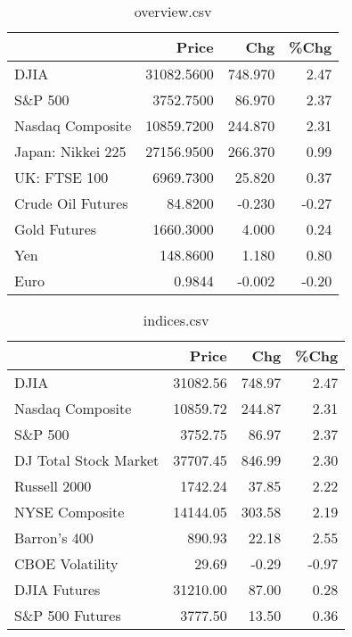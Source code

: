 \documentclass{article}%
\begin{document}
\begin{table}[htbp]%
\caption{overview.csv}%
\centering%
\begin{adjustbox}{width=1\textwidth}%
\begin{tabular}{lrrr}
\toprule
                  &      Price &     Chg &  \%Chg \\
\midrule
             DJIA & 31082.5600 & 748.970 &  2.47 \\
          S\&P 500 &  3752.7500 &  86.970 &  2.37 \\
 Nasdaq Composite & 10859.7200 & 244.870 &  2.31 \\
Japan: Nikkei 225 & 27156.9500 & 266.370 &  0.99 \\
     UK: FTSE 100 &  6969.7300 &  25.820 &  0.37 \\
Crude Oil Futures &    84.8200 &  -0.230 & -0.27 \\
     Gold Futures &  1660.3000 &   4.000 &  0.24 \\
              Yen &   148.8600 &   1.180 &  0.80 \\
             Euro &     0.9844 &  -0.002 & -0.20 \\
\bottomrule
\end{tabular}
%
\end{adjustbox}%
\end{table}

%


\begin{table}[htbp]%
\caption{indices.csv}%
\centering%
\begin{adjustbox}{width=1\textwidth}%
\begin{tabular}{lrrr}
\toprule
                      &    Price &    Chg &  \%Chg \\
\midrule
                 DJIA & 31082.56 & 748.97 &  2.47 \\
     Nasdaq Composite & 10859.72 & 244.87 &  2.31 \\
              S\&P 500 &  3752.75 &  86.97 &  2.37 \\
DJ Total Stock Market & 37707.45 & 846.99 &  2.30 \\
         Russell 2000 &  1742.24 &  37.85 &  2.22 \\
       NYSE Composite & 14144.05 & 303.58 &  2.19 \\
         Barron's 400 &   890.93 &  22.18 &  2.55 \\
      CBOE Volatility &    29.69 &  -0.29 & -0.97 \\
         DJIA Futures & 31210.00 &  87.00 &  0.28 \\
      S\&P 500 Futures &  3777.50 &  13.50 &  0.36 \\
\bottomrule
\end{tabular}
%
\end{adjustbox}%
\end{table}
\end{document}
